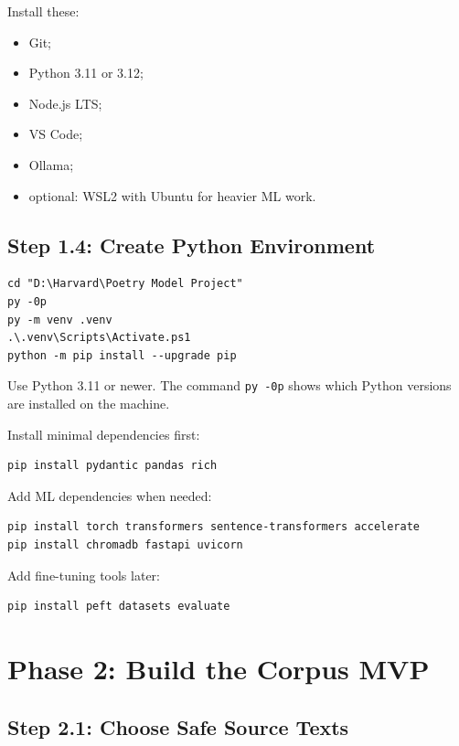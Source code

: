 \documentclass[11pt]{article}
\begin{document}
Install these:

\begin{itemize}
  \item Git;
  \item Python 3.11 or 3.12;
  \item Node.js LTS;
  \item VS Code;
  \item Ollama;
  \item optional: WSL2 with Ubuntu for heavier ML work.
\end{itemize}

\subsection{Step 1.4: Create Python Environment}

\begin{verbatim}
cd "D:\Harvard\Poetry Model Project"
py -0p
py -m venv .venv
.\.venv\Scripts\Activate.ps1
python -m pip install --upgrade pip
\end{verbatim}

Use Python 3.11 or newer. The command \verb|py -0p| shows which Python versions
are installed on the machine.

Install minimal dependencies first:

\begin{verbatim}
pip install pydantic pandas rich
\end{verbatim}

Add ML dependencies when needed:

\begin{verbatim}
pip install torch transformers sentence-transformers accelerate
pip install chromadb fastapi uvicorn
\end{verbatim}

Add fine-tuning tools later:

\begin{verbatim}
pip install peft datasets evaluate
\end{verbatim}

\section{Phase 2: Build the Corpus MVP}

\subsection{Step 2.1: Choose Safe Source Texts}
\end{document}
